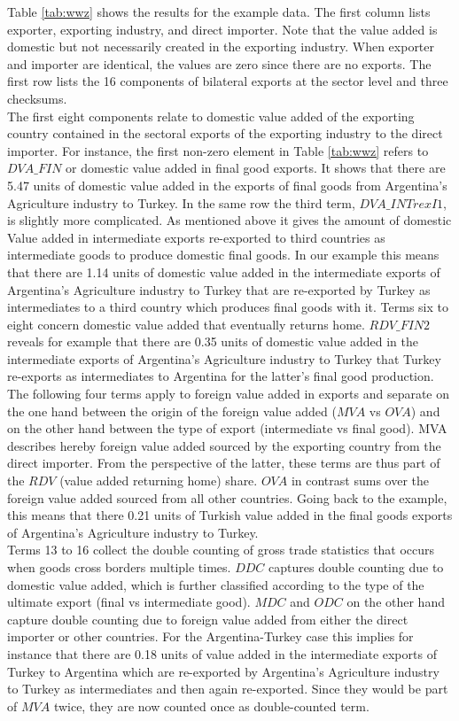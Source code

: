 \documentclass{article}
\begin{document}
Table \ref{tab:wwz} shows the results for the example data. The first column lists exporter, exporting industry, and direct importer. Note that the value added is domestic but not necessarily created in the exporting industry. When exporter and importer are identical, the values are zero since there are no exports. The first row lists the 16 components of bilateral exports at the sector level and three checksums.\\
The first eight components relate to domestic value added of the exporting country contained in the sectoral exports of the exporting industry to the direct importer. For instance, the first non-zero element in Table \ref{tab:wwz} refers to \(DVA\_FIN\) or domestic value added in final good exports. It shows that there are 5.47 units of domestic value added in the exports of final goods from Argentina's Agriculture industry to Turkey. In the same row the third term,  \(DVA\_INTrexI1\), is slightly more complicated. As mentioned above it gives the amount of domestic Value added in intermediate exports re-exported to third countries as intermediate goods to produce domestic final goods. In our example this means that there are 1.14 units of domestic value added in the intermediate exports of Argentina's Agriculture industry to Turkey that are re-exported by Turkey as intermediates to a third country which produces final goods with it. Terms six to eight concern domestic value added that eventually returns home. \(RDV\_FIN2\) reveals for example that there are 0.35 units of domestic value added in the intermediate exports of Argentina's Agriculture industry to Turkey that Turkey re-exports as intermediates to Argentina for the latter's final good production.\\
The following four terms apply to foreign value added in exports and separate on the one hand between the origin of the foreign value added (\(MVA\) vs \(OVA\)) and on the other hand between the type of export (intermediate vs final good). MVA describes hereby foreign value added sourced by the exporting country from the direct importer. From the perspective of the latter, these terms are thus part of the \(RDV\) (value added returning home) share. \(OVA\) in contrast sums over the foreign value added sourced from all other countries. Going back to the example, this means that there 0.21 units of Turkish value added in the final goods exports of Argentina's Agriculture industry to Turkey.\\
Terms 13 to 16 collect the double counting of gross trade statistics that occurs when goods cross borders multiple times. \(DDC\) captures double counting due to domestic value added, which is further classified according to the type of the ultimate export (final vs intermediate good). \(MDC\) and \(ODC\) on the other hand capture double counting due to foreign value added from either the direct importer or other countries. For the Argentina-Turkey case this implies for instance that there are 0.18 units of value added in the intermediate exports of Turkey to Argentina which are re-exported by Argentina's Agriculture industry to Turkey as intermediates and then again re-exported. Since they would be part of \(MVA\) twice, they are now counted once as double-counted term.\\
\end{document}
